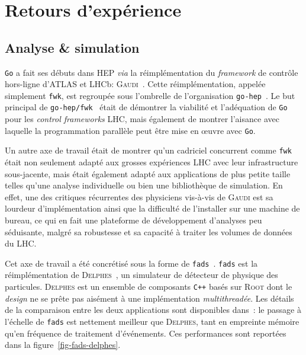 \documentclass[a4paper,french]{article}
\begin{document}
\section*{Retours d'exp\'erience}


\subsection*{Analyse \& simulation}

\texttt{Go} a fait ses d\'ebuts dans HEP \emph{via} la r\'eimpl\'ementation du
\emph{framework} de contr\^ole hors-ligne d'ATLAS et LHCb:
\textsc{Gaudi}~\cite{ref-gaudi}.
Cette r\'eimpl\'ementation, appel\'ee simplement \texttt{fwk}, est regroup\'ee
sous l'ombrelle de l'organisation \texttt{go-hep}~\cite{ref-gohep}.
Le but principal de \texttt{go-hep/fwk}~\cite{ref-gohep-fwk} \'etait de
d\'emontrer la viabilit\'e et l'ad\'equation de \texttt{Go} pour les
\emph{control frameworks} LHC, mais \'egalement de montrer l'aisance avec
laquelle la programmation parall\`ele peut \^etre mise en \oe uvre avec
\texttt{Go}.

Un autre axe de travail \'etait de montrer qu'un cadriciel concurrent comme
\texttt{fwk} \'etait non seulement adapt\'e aux grosses exp\'eriences LHC avec
leur infrastructure sous-jacente, mais \'etait \'egalement adapt\'e aux
applications de plus petite taille telles qu'une analyse individuelle ou bien
une biblioth\`eque de simulation.
En effet, une des critiques r\'ecurrentes des physiciens vis-\`a-vis de
\textsc{Gaudi} est sa lourdeur d'impl\'ementation ainsi que la difficult\'e de
l'installer sur une machine de bureau, ce qui en fait une
plateforme de d\'eveloppement d'analyses peu s\'eduisante, malgr\'e sa
robustesse et sa capacit\'e \`a traiter les volumes de donn\'ees du LHC.

Cet axe de travail a \'et\'e concr\'etis\'e sous la forme de
\texttt{fads}~\cite{ref-fads}.
\texttt{fads} est la r\'eimpl\'ementation de
\textsc{Delphes}~\cite{ref-delphes}, un simulateur de d\'etecteur de physique
des particules.
\textsc{Delphes} est un ensemble de composants \texttt{C++} bas\'es sur
\textsc{Root} dont le \emph{design} ne se pr\^ete pas ais\'ement \`a une
impl\'ementation \emph{multithread\'ee}.
Les d\'etails de la comparaison entre les deux applications sont disponibles
dans~\cite{ref-fads-hsf}: le passage \`a l'\'echelle de \texttt{fads} est
nettement meilleur que \textsc{Delphes}, tant en empreinte m\'emoire qu'en
fr\'equence de traitement d'\'ev\'enements.
Ces performances sont report\'ees dans la figure~\ref{fig-fads-delphes}.
\end{document}
